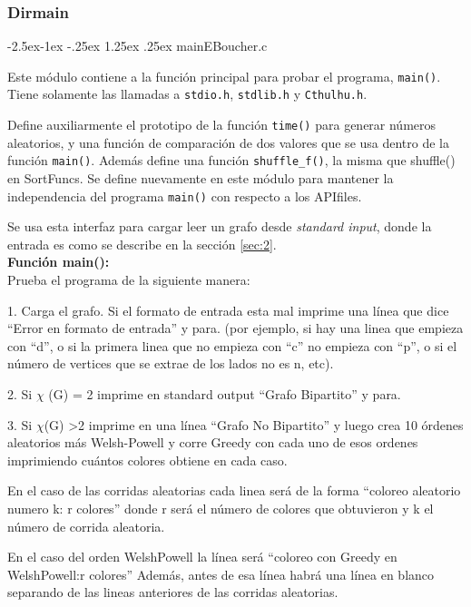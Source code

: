 \documentclass[11pt,a4paper]{article}
\makeatletter
\renewcommand\paragraph{\@startsection{paragraph}{4}{\z@}%
            {-2.5ex\@plus -1ex \@minus -.25ex}%
            {1.25ex \@plus .25ex}%
            {\normalfont\normalsize\bfseries}}
\theoremstyle{plain}
\makeatother
\begin{document}
			\subsubsection{Dirmain}
			
				\paragraph{mainEBoucher.c}

Este módulo contiene a la función principal para probar el programa, \texttt{main()}. Tiene solamente las llamadas a \texttt{stdio.h}, \texttt{stdlib.h} y \texttt{Cthulhu.h}.

Define auxiliarmente el prototipo de la función \texttt{time()} para generar números aleatorios, y una función de comparación de dos valores que se usa dentro de la función \texttt{main()}. Además define una función \texttt{shuffle\_f()}, la misma que shuffle() en SortFuncs. Se define nuevamente en este módulo para mantener la independencia del programa \texttt{main()} con respecto a los APIfiles.

Se usa esta interfaz para cargar leer un grafo desde \emph{standard input}, donde la entrada es como se describe en la sección \ref{sec:2}.\\


\textbf{{Función main():}}\\

Prueba el programa de la siguiente manera:

1. Carga el grafo. Si el formato de entrada esta mal imprime una línea que dice “Error en formato de entrada” y para. (por ejemplo, si hay una linea que empieza con “d”, o si la primera linea que no empieza con “c” no empieza con “p”, o si el número de vertices que se extrae de los lados no es n, etc).

2. Si $\chi$ (G) = 2 imprime en standard output “Grafo Bipartito” y para.

3. Si $\chi$(G) \textgreater 2 imprime en una línea “Grafo No Bipartito” y luego crea 10 órdenes aleatorios más Welsh-Powell y corre Greedy con cada uno de esos ordenes imprimiendo cuántos colores obtiene en cada caso.

En el caso de las corridas aleatorias cada linea será de la forma
“coloreo aleatorio numero k: r colores” donde r será el número de colores que obtuvieron y k el número de corrida aleatoria.

En el caso del orden WelshPowell la línea será “coloreo con Greedy en WelshPowell:r colores” Además, antes de esa línea habrá una línea en blanco separando de las lineas anteriores de las corridas aleatorias.
\end{document}

